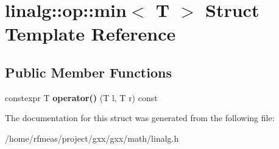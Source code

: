 \hypertarget{structlinalg_1_1op_1_1min}{}\section{linalg\+:\+:op\+:\+:min$<$ T $>$ Struct Template Reference}
\label{structlinalg_1_1op_1_1min}
\subsection*{Public Member Functions}
\begin{DoxyCompactItemize}
\item 
constexpr T {\bfseries operator()} (T l, T r) const \hypertarget{structlinalg_1_1op_1_1min_a99976d520cdc12594e5865b99babdc2d}{}\label{structlinalg_1_1op_1_1min_a99976d520cdc12594e5865b99babdc2d}

\end{DoxyCompactItemize}


The documentation for this struct was generated from the following file\+:\begin{DoxyCompactItemize}
\item 
/home/rfmeas/project/gxx/gxx/math/linalg.\+h\end{DoxyCompactItemize}
